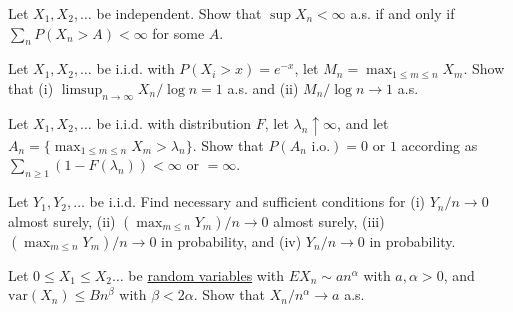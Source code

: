   \begin{exercise}[Durrett 2.3.14]
    Let $X_1, X_2, \dots$ be independent. Show that $\sup X_n < \infty$ a.s. if and only if $\sum_n P(X_n > A) < \infty$ for some $A$.
  \end{exercise}
  \begin{solution}

  \end{solution}

  \begin{exercise}[Durrett 2.3.15]
    Let $X_1, X_2, \dots$ be i.i.d. with $P(X_i > x) = e^{-x}$, let $M_n = \max_{1 \leq m \leq n} X_m$. Show that (i) $\limsup_{n \to \infty} X_n/ \log n = 1$ a.s. and (ii) $M_n/ \log n \to 1$ a.s.
  \end{exercise}
  \begin{solution}

  \end{solution}

  \begin{exercise}[Durrett 2.3.16]
    Let $X_1, X_2, \dots$ be i.i.d. with distribution $F$, let $\lambda_n \uparrow \infty$, and let $A_n = \{\max_{1 \leq m \leq n} X_m > \lambda_n \}$. Show that $P(A_n \text{ i.o.}) = 0$ or $1$ according as $\sum_{n \geq 1} (1 - F(\lambda_n)) < \infty$ or $= \infty$.
  \end{exercise}
  \begin{solution}

  \end{solution}

  \begin{exercise}[Durrett 2.3.17]
    Let $Y_1, Y_2, \dots$ be i.i.d. Find necessary and sufficient conditions for (i) $Y_n/n \to 0$ almost surely, (ii) $(\max_{m \leq n} Y_m)/n \to 0$ almost surely, (iii) $(\max_{m \leq n} Y_m)/n \to 0$ in probability, and (iv) $Y_n/n \to 0$ in probability.
  \end{exercise}
  \begin{solution}

  \end{solution}

  \begin{exercise}[Durrett 2.3.18]
    Let $0 \leq X_1 \leq X_2 \dots$ be \hyperref[def:random-variable]{random variables} with $EX_n \sim an^{\alpha}$ with $a, \alpha > 0$, and $\text{var}(X_n) \leq Bn^{\beta}$ with $\beta < 2\alpha$. Show that $X_n/n^{\alpha} \to a$ a.s.
  \end{exercise}
  \begin{solution}

  \end{solution}

